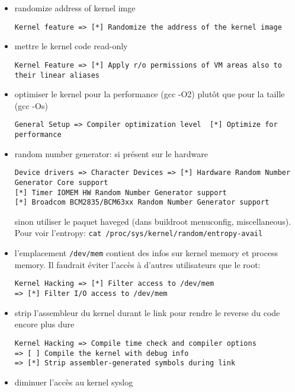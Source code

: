 \begin{itemize}
\item randomize address of kernel imge
\begin{Verbatim}[breaklines=true, breakanywhere=true]
Kernel feature => [*] Randomize the address of the kernel image
\end{Verbatim}
\item mettre le kernel code read-only
\begin{Verbatim}[breaklines=true, breakanywhere=true]
Kernel Feature => [*] Apply r/o permissions of VM areas also to their linear aliases
\end{Verbatim}
\item optimiser le kernel pour la performance (gcc -O2) plutôt que pour la taille (gcc -Os)
\begin{Verbatim}[breaklines=true, breakanywhere=true]
General Setup => Compiler optimization level  [*] Optimize for performance
\end{Verbatim}
\item random number generator: si présent sur le hardware
\begin{Verbatim}[breaklines=true, breakanywhere=true]
Device drivers => Character Devices => [*] Hardware Random Number Generator Core support
[*] Timer IOMEM HW Random Number Generator support 
[*] Broadcom BCM2835/BCM63xx Random Number Generator support
\end{Verbatim}
sinon utiliser le paquet haveged (dans buildroot menuconfig, miscellaneous). Pour voir l'entropy:  \verb!cat /proc/sys/kernel/random/entropy-avail!
\item l'emplacement \verb!/dev/mem! contient des infos sur kernel memory et process memory. Il faudrait éviter l'accès à d'autres utilisateurs que le root: 
\begin{Verbatim}[breaklines=true, breakanywhere=true]
Kernel Hacking => [*] Filter access to /dev/mem
=> [*] Filter I/O access to /dev/mem
\end{Verbatim}
\item strip l'assembleur du kernel durant le link pour rendre le reverse du code encore plus dure
\begin{Verbatim}[breaklines=true, breakanywhere=true]
Kernel Hacking => Compile time check and compiler options
=> [ ] Compile the kernel with debug info
=> [*] Strip assembler-generated symbols during link
\end{Verbatim}
\item diminuer l'accès au kernel syslog
\begin{Verbatim}[breaklines=true, breakanywhere=true]

\end{Verbatim}
\end{itemize}
